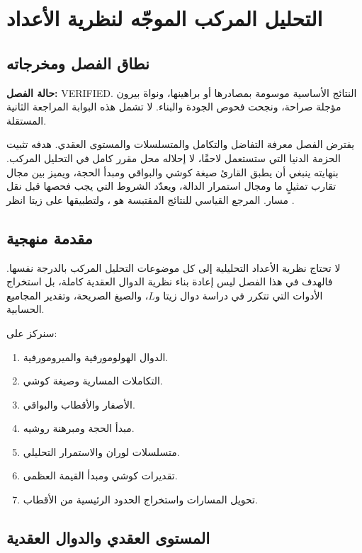 \chapter{التحليل المركب الموجّه لنظرية الأعداد}

\section{نطاق الفصل ومخرجاته}

\noindent\textbf{حالة الفصل:} \textenglish{VERIFIED}. النتائج الأساسية
موسومة بمصادرها أو براهينها، ونواة بيرون مؤجلة صراحة، ونجحت فحوص الجودة
والبناء. لا تشمل هذه البوابة المراجعة الثانية المستقلة.

يفترض الفصل معرفة التفاضل والتكامل والمتسلسلات والمستوى العقدي. هدفه
تثبيت الحزمة الدنيا التي ستستعمل لاحقًا، لا إحلاله محل مقرر كامل في
التحليل المركب. بنهايته ينبغي أن يطبق القارئ صيغة كوشي والبواقي ومبدأ
الحجة، ويميز بين مجال تقارب تمثيلٍ ما ومجال استمرار الدالة، ويعدّد
الشروط التي يجب فحصها قبل نقل مسار. المرجع القياسي للنتائج المقتبسة هو
\cite{Ahlfors1979}، ولتطبيقها على زيتا انظر \cite{Titchmarsh1986}.

\section{مقدمة منهجية}

لا تحتاج نظرية الأعداد التحليلية إلى كل موضوعات التحليل المركب بالدرجة نفسها. فالهدف في هذا الفصل ليس إعادة بناء نظرية الدوال العقدية كاملة، بل استخراج الأدوات التي تتكرر في دراسة دوال زيتا و\(L\)، والصيغ الصريحة، وتقدير المجاميع الحسابية.

سنركز على:

\begin{enumerate}
  \item الدوال الهولومورفية والميرومورفية.
  \item التكاملات المسارية وصيغة كوشي.
  \item الأصفار والأقطاب والبواقي.
  \item مبدأ الحجة ومبرهنة روشيه.
  \item متسلسلات لوران والاستمرار التحليلي.
  \item تقديرات كوشي ومبدأ القيمة العظمى.
  \item تحويل المسارات واستخراج الحدود الرئيسية من الأقطاب.
\end{enumerate}

\section{المستوى العقدي والدوال العقدية}

